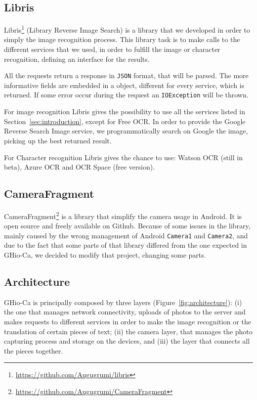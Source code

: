 \subsection{Libris}
Libris\footnote{\url{https://github.com/Augugrumi/libris}} (Library Reverse
Image Search) is a library that we developed in order to
simply the image recognition process. This library task is to make calls to the
different services that we used, in order to fulfill the image or character
recognition, defining an interface for the results.

All the requests return a response in \texttt{JSON} format, that will be parsed.
The more informative fields are embedded in a object, different for every
service, which is returned. If some error occur during the request an
\texttt{IOException} will be thrown.

For image recognition Libris gives the possibility to use all the services
listed in Section~\ref{sec:introduction}, except for Free OCR. In order to
provide the Google Reverse Search Image service, we programmatically search on
Google the image, picking up the best returned result.

For Character recognition Libris gives the chance to use: Watson OCR (still in
beta), Azure OCR and OCR Space (free version).

\subsection{CameraFragment}
CameraFragment\footnote{\url{https://github.com/Augugrumi/CameraFragment}} is a
library that simplify the camera usage in Android. It is
open source and freely available on Github. Because of some issues in the
library, mainly caused by the wrong management of Android \texttt{Camera1} and
\texttt{Camera2}, and due to the fact that some parts of that library differed
from the one expected in GHio-Ca, we decided to modify that project, changing
some parts.

\subsection{Architecture}
GHio-Ca is principally composed by three layers (Figure~\ref{fig:architecture}):
(i) the one that manages network connectivity, uploads of photos to the server
and makes requests to different services in order to make the image recognition
or the translation of certain pieces of text; (ii) the camera layer, that
manages the photo capturing process and storage on the devices, and (iii) the
layer that
connects all the pieces together.

